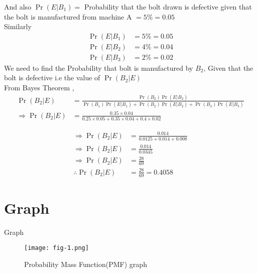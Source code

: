 \documentclass{beamer}
\providecommand{\pr}[1]{\ensuremath{\Pr\left(#1\right)}}
\begin{document}
\begin{frame}

And also $\pr{E|B_1} = $ Probability that the bolt drawn is defective given that the bolt is manufactured from machine A $ = 5\% = 0.05 $ \\
Similarly
\begin{align}
\pr{E|B_1} &= 5\% = 0.05 \\
\pr{E|B_2} &= 4\% = 0.04 \\
\pr{E|B_3} &= 2\% = 0.02
\end{align}
We need to find the Probability that bolt is manufactured by $B_2$, Given that the bolt is defective i.e  the value of $\pr{B_2|E}$ \\
From Bayes Theorem , \\
\begin{align}
\pr{B_2|E} &= \frac{\pr{B_2}\pr{E|B_2}}{\pr{B_1}\pr{E|B_1}+\pr{B_2}\pr{E|B_2}+\pr{B_3}\pr{E|B_3}} \\
\Rightarrow \pr{B_2|E} &= \frac{0.35 \times 0.04}{0.25 \times 0.05 + 0.35 \times 0.04 + 0.4 \times 0.02 }
\end{align}

\end{frame}

\begin{frame}

\begin{align}
\Rightarrow \pr{B_2|E} &= \frac{0.014}{0.0125+0.014+0.008} \\
\Rightarrow \pr{B_2|E} &= \frac{0.014}{0.0345} \\ 
\Rightarrow \pr{B_2|E} &= \frac{28}{69} \\ 
\therefore \pr{B_2|E} &= \frac{28}{69} = 0.4058 
\end{align}

\end{frame}

\section{Graph}
\begin{frame}{Graph}
\begin{figure}[h]
\texttt{[image: fig-1.png]}
\caption{Probability Mass Function(PMF) graph}
\label{Fig-1}
\end{figure}
\end{frame}
\end{document}
